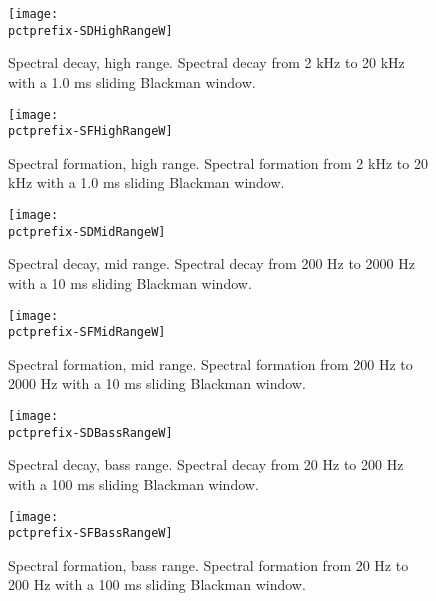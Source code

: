 \documentclass[a4paper,titlepage]{article}
\newcommand{\pctprefix}{T}
\newcommand{\pctwidth}{1.0}
\begin{document}

\begin{figure}
\begin{minipage}{\textwidth}
\begin{center}
\texttt{[image: \\pctprefix-SDHighRangeW]}
\caption{Spectral decay, high range. Spectral decay from 2 kHz to 20 kHz
with a 1.0 ms sliding Blackman window.}
\end{center}
\end{minipage}

\begin{minipage}{\textwidth}
\begin{center}
\texttt{[image: \\pctprefix-SFHighRangeW]}
\caption{Spectral formation,  high range. Spectral  formation from 2 kHz
to 20 kHz with a 1.0 ms sliding Blackman window.}
\end{center}
\end{minipage}
\end{figure}

\clearpage

\begin{figure}
\begin{minipage}{\textwidth}
\begin{center}
\texttt{[image: \\pctprefix-SDMidRangeW]}
\caption{Spectral decay,  mid range. Spectral  decay from 200 Hz to 2000
Hz with a 10 ms sliding Blackman window.}
\end{center}
\end{minipage}

\begin{minipage}{\textwidth}
\begin{center}
\texttt{[image: \\pctprefix-SFMidRangeW]}
\caption{Spectral formation,  mid range. Spectral  formation from 200 Hz
to 2000 Hz with a 10 ms sliding Blackman window.}
\end{center}
\end{minipage}
\end{figure}

\clearpage

\begin{figure}
\begin{minipage}{\textwidth}
\begin{center}
\texttt{[image: \\pctprefix-SDBassRangeW]}
\caption{Spectral decay, bass range. Spectral decay from 20 Hz to 200 Hz
with a 100 ms sliding Blackman window.}
\end{center}
\end{minipage}

\begin{minipage}{\textwidth}
\begin{center}
\texttt{[image: \\pctprefix-SFBassRangeW]}
\caption{Spectral formation,  bass range. Spectral  formation from 20 Hz
to 200 Hz with a 100 ms sliding Blackman window.}
\end{center}
\end{minipage}
\end{figure}
\end{document}
